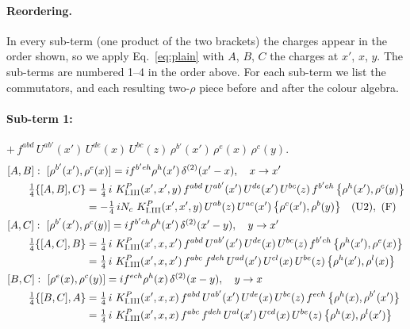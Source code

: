 \documentclass[10pt]{article}
\numberwithin{equation}{section}
\begin{document}
\paragraph{Reordering.} In every sub-term (one product of the two brackets) the charges appear in the order shown, so we apply Eq.~\eqref{eq:plain} with $A$, $B$, $C$ the charges at $x'$, $x$, $y$. The sub-terms are numbered 1--4 in the order above. For each sub-term we list the commutators, and each resulting two-$\rho$ piece before and after the colour algebra.
\paragraph{Sub-term 1:} $+\,f^{abd}\,U^{ab'}(x')\,U^{de}(x)\,U^{bc}(z)\,\rho^{b'}(x')\,\rho^{e}(x)\,\rho^{c}(y)$.
\begin{align}
&[A,B]:\ [\rho^{b'}(x'),\rho^{e}(x)]=i f^{b'eh}\rho^{h}(x')\,\delta^{(2)}(x'-x),\quad x\to x'\notag\\
&\qquad \tfrac14\{[A,B],C\}=\tfrac14\,i\,\,K^{P}_{\rm I.III}(x',x',y)\,f^{abd}\,U^{ab'}(x')\,U^{de}(x')\,U^{bc}(z)\,f^{b'eh}\,\big\{\rho^{h}(x'),\rho^{c}(y)\big\}\notag\\
&\qquad\phantom{\tfrac14\{[A,B],C\}}=-\tfrac14\,i N_{c}\,\,K^{P}_{\rm I.III}(x',x',y)\,U^{ab}(z)\,U^{ac}(x')\,\big\{\rho^{c}(x'),\rho^{b}(y)\big\}\quad\text{(U2)},\ \text{(F)}
\label{eq:GI.III.P-1-AB}\\
&[A,C]:\ [\rho^{b'}(x'),\rho^{c}(y)]=i f^{b'ch}\rho^{h}(x')\,\delta^{(2)}(x'-y),\quad y\to x'\notag\\
&\qquad \tfrac14\{[A,C],B\}=\tfrac14\,i\,\,K^{P}_{\rm I.III}(x',x,x')\,f^{abd}\,U^{ab'}(x')\,U^{de}(x)\,U^{bc}(z)\,f^{b'ch}\,\big\{\rho^{h}(x'),\rho^{e}(x)\big\}\notag\\
&\qquad\phantom{\tfrac14\{[A,C],B\}}=\tfrac14\,i\,\,K^{P}_{\rm I.III}(x',x,x')\,f^{abc}\,f^{deh}\,U^{ad}(x')\,U^{cl}(x)\,U^{be}(z)\,\big\{\rho^{h}(x'),\rho^{l}(x)\big\}
\label{eq:GI.III.P-1-AC}\\
&[B,C]:\ [\rho^{e}(x),\rho^{c}(y)]=i f^{ech}\rho^{h}(x)\,\delta^{(2)}(x-y),\quad y\to x\notag\\
&\qquad \tfrac14\{[B,C],A\}=\tfrac14\,i\,\,K^{P}_{\rm I.III}(x',x,x)\,f^{abd}\,U^{ab'}(x')\,U^{de}(x)\,U^{bc}(z)\,f^{ech}\,\big\{\rho^{h}(x),\rho^{b'}(x')\big\}\notag\\
&\qquad\phantom{\tfrac14\{[B,C],A\}}=\tfrac14\,i\,\,K^{P}_{\rm I.III}(x',x,x)\,f^{abc}\,f^{deh}\,U^{al}(x')\,U^{cd}(x)\,U^{be}(z)\,\big\{\rho^{h}(x),\rho^{l}(x')\big\}
\label{eq:GI.III.P-1-BC}
\end{align}
\end{document}

